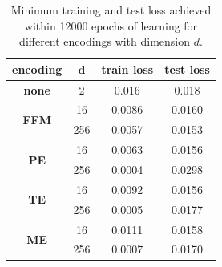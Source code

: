 \begin{table}
  \caption{Minimum training and test loss achieved within 12000 epochs of learning for different encodings with dimension $d$.}
  \label{train_test_losses}
  \vspace{0.2cm}
  \centering
  \begin{tabular}[H]{cccc}
    \toprule
  \textbf{encoding} & $\boldsymbol{d}$ &\textbf{train loss} &\textbf{test loss}\\
  \midrule
  \textbf{none} & 2 & 0.016 & 0.018 \\
  \midrule
  \multirow{2}{*}{\textbf{FFM}} & 16 & 0.0086 & 0.0160 \\
    & 256 & 0.0057 & 0.0153 \\
  \midrule
  \multirow{2}{*}{\textbf{PE}} & 16 & 0.0063 & 0.0156 \\
  & 256 & 0.0004 & 0.0298 \\
  \midrule
  \multirow{2}{*}{\textbf{TE}} & 16 & 0.0092 & 0.0156 \\
    & 256 & 0.0005 & 0.0177 \\
  \midrule
  \multirow{2}{*}{\textbf{ME}} & 16 & 0.0111 & 0.0158 \\
  & 256 & 0.0007 & 0.0170 \\
  \bottomrule
  \end{tabular}
\end{table}

